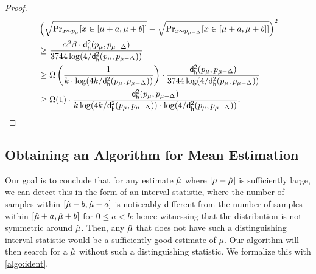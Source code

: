 \begin{proof}
    \begin{align*}
        & \left( \sqrt{\operatorname{{Pr}}_{x \sim p_{\mu}}[x \in [\mu+a,\mu+b]]} -  \sqrt{\operatorname{{Pr}}_{x \sim p_{\mu-\Delta}}[x \in [\mu+a,\mu+b]]} \right)^2 \\
        & \ge \frac{\alpha^2 \beta \cdot \mathsf{d_{h}^2}(p_{\mu},p_{\mu-\Delta})}{3744 \log(4/\mathsf{d_{h}^2}(p_{\mu},p_{\mu-\Delta}))} \\
        & \ge \Omega\left(\frac{1}{k \cdot \log(4k/\mathsf{d_{h}^2}(p_{\mu},p_{\mu-\Delta}))}\right) \cdot \frac{\mathsf{d_{h}^2}(p_{\mu},p_{\mu-\Delta})}{3744 \log(4/\mathsf{d_{h}^2}(p_{\mu},p_{\mu-\Delta}))}\\
        & \ge \Omega(1) \cdot \frac{\mathsf{d_{h}^2}(p_{\mu},p_{\mu-\Delta})}{k \log(4k/\mathsf{d_{h}^2}(p_{\mu},p_{\mu-\Delta})) \cdot \log(4/\mathsf{d_{h}^2}(p_{\mu},p_{\mu-\Delta}))}.
    \end{align*}
    
\end{proof}

\subsection{Obtaining an Algorithm for Mean Estimation}\label{sec:alg}
Our goal is to conclude that for any estimate $\hat{\mu}$ where $|\mu - \hat{\mu}|$ is sufficiently large, we can detect this in the form of an interval statistic, where the number of samples within $[\hat{\mu}-b,\hat{\mu}-a]$ is noticeably different from the number of samples within $[\hat{\mu}+a,\hat{\mu}+b]$ for $0 \le a < b$: hence witnessing that the distribution is not symmetric around $\hat{\mu}$. Then, any $\hat{\mu}$ that does not have such a distinguishing interval statistic would be a sufficiently good estimate of $\mu$. Our algorithm will then search for a $\hat{\mu}$ without such a distinguishing statistic. We formalize this with \cref{algo:ident}.


